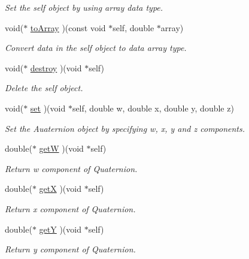 \begin{CompactItemize}
\begin{CompactList}\small\item\em Set the self object by using array data type. \item\end{CompactList}\item 
void($\ast$ \hyperlink{structdrdc__Orient__t_743034467ae09dc406254e1a2ead4831}{toArray} )(const void $\ast$self, double $\ast$array)
\begin{CompactList}\small\item\em Convert data in the self object to data array type. \item\end{CompactList}\item 
void($\ast$ \hyperlink{structdrdc__Orient__t_63ca59a43edbdfc554318bf802830277}{destroy} )(void $\ast$self)
\begin{CompactList}\small\item\em Delete the self object. \item\end{CompactList}\item 
void($\ast$ \hyperlink{structdrdc__Orient__t_eda80d52d1eef8480b02e38c1b2079c8}{set} )(void $\ast$self, double w, double x, double y, double z)
\begin{CompactList}\small\item\em Set the Auaternion object by specifying w, x, y and z components. \item\end{CompactList}\item 
double($\ast$ \hyperlink{structdrdc__Orient__t_05db22caf07cfd2672fcc6daef167ad7}{getW} )(void $\ast$self)
\begin{CompactList}\small\item\em Return w component of Quaternion. \item\end{CompactList}\item 
double($\ast$ \hyperlink{structdrdc__Orient__t_735b8ebd199a1e71872e08b96f613e5f}{getX} )(void $\ast$self)
\begin{CompactList}\small\item\em Return x component of Quaternion. \item\end{CompactList}\item 
double($\ast$ \hyperlink{structdrdc__Orient__t_2a605d16af23ba39281358b780feb4f7}{getY} )(void $\ast$self)
\begin{CompactList}\small\item\em Return y component of Quaternion. \item\end{CompactList}\item 

\end{CompactItemize}
